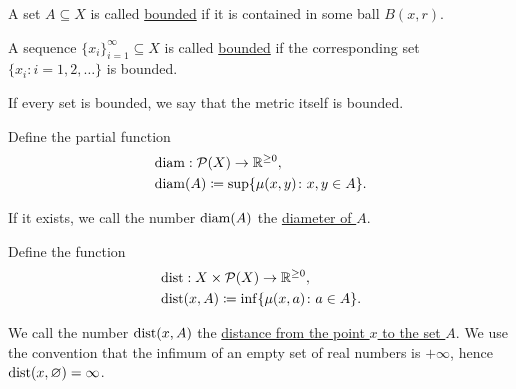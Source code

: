 \begin{definition}
\begin{defenum}
    \item\label{def:metric_space/bounded_set} A set $A \subseteq X$ is called \ul{bounded} if it is contained in some ball $B(x, r)$.

    \item\label{def:metric_space/bounded_sequence} A sequence $\{ x_i \}_{i=1}^\infty \subseteq X$ is called \ul{bounded} if the corresponding set $\{ x_i \colon i = 1, 2, \ldots \}$ is bounded.

    \item\label{def:metric_space/bounded_metric} If every set is bounded, we say that the metric itself is bounded.

    \item\label{def:metric_space/diameter} Define the partial function
    \begin{align*}
      &\operatorname{diam}: \operatorname{\mathcal P}(X) \to \mathbb R^{\geq 0}, \\
      &\operatorname{diam}(A) \coloneqq \sup \{ \mu(x, y) \colon x, y \in A \}.
    \end{align*}

    If it exists, we call the number $\operatorname{diam}(A)$ the \ul{diameter of $A$}.

    \item\label{def:metric_space/distance} Define the function
    \begin{align*}
      &\operatorname{dist}: X \times \operatorname{\mathcal P}(X) \to \mathbb R^{\geq 0}, \\
      &\operatorname{dist}(x, A) \coloneqq \inf \{ \mu(x, a) \colon a \in A \}.
    \end{align*}

    We call the number $\operatorname{dist}(x, A)$ the \ul{distance from the point $x$ to the set $A$}. We use the convention that the infimum of an empty set of real numbers is $+\infty$, hence $\operatorname{dist}(x, \varnothing) = \infty$.
  \end{defenum}
\end{definition}

